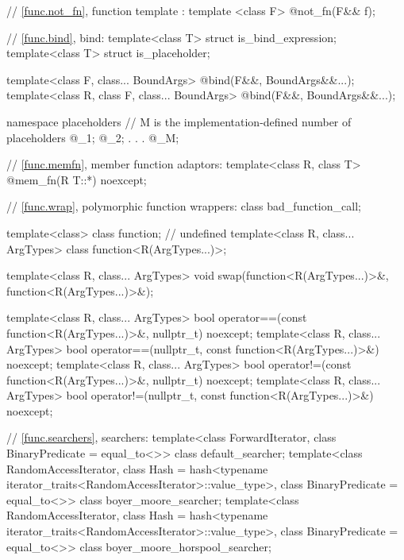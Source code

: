 \begin{codeblock}
{  // \ref{func.not_fn}, function template :
  template <class F> @\unspec@ not_fn(F&& f);

  // \ref{func.bind}, bind:
  template<class T> struct is_bind_expression;
  template<class T> struct is_placeholder;

  template<class F, class... BoundArgs>
    @\unspec@ bind(F&&, BoundArgs&&...);
  template<class R, class F, class... BoundArgs>
    @\unspec@ bind(F&&, BoundArgs&&...);

  namespace placeholders {
    // M is the implementation-defined number of placeholders
    @\seebelow@ _1;
    @\seebelow@ _2;
                .
                .
                .
    @\seebelow@ _M;
  }

  // \ref{func.memfn}, member function adaptors:
  template<class R, class T> @\unspec@ mem_fn(R T::*) noexcept;

  // \ref{func.wrap}, polymorphic function wrappers:
  class bad_function_call;

  template<class> class function; // undefined
  template<class R, class... ArgTypes> class function<R(ArgTypes...)>;

  template<class R, class... ArgTypes>
    void swap(function<R(ArgTypes...)>&, function<R(ArgTypes...)>&);

  template<class R, class... ArgTypes>
    bool operator==(const function<R(ArgTypes...)>&, nullptr_t) noexcept;
  template<class R, class... ArgTypes>
    bool operator==(nullptr_t, const function<R(ArgTypes...)>&) noexcept;
  template<class R, class... ArgTypes>
    bool operator!=(const function<R(ArgTypes...)>&, nullptr_t) noexcept;
  template<class R, class... ArgTypes>
    bool operator!=(nullptr_t, const function<R(ArgTypes...)>&) noexcept;

  // \ref{func.searchers}, searchers:
  template<class ForwardIterator, class BinaryPredicate = equal_to<>>
    class default_searcher;
  template<class RandomAccessIterator,
           class Hash = hash<typename iterator_traits<RandomAccessIterator>::value_type>,
           class BinaryPredicate = equal_to<>>
    class boyer_moore_searcher;
  template<class RandomAccessIterator,
           class Hash = hash<typename iterator_traits<RandomAccessIterator>::value_type>,
           class BinaryPredicate = equal_to<>>
    class boyer_moore_horspool_searcher;

}
\end{codeblock}
